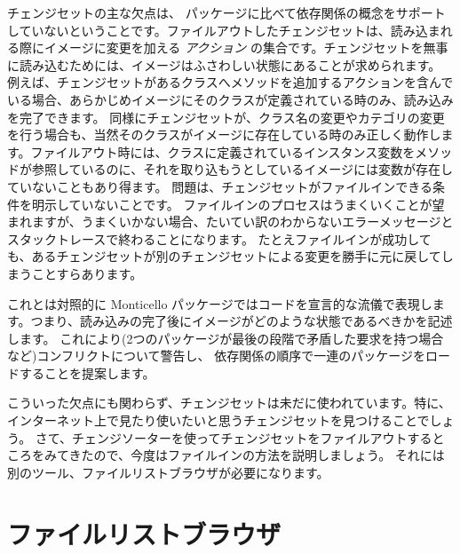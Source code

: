 \documentclass[a4paper,10pt,twoside]{book}
\begin{document}
チェンジセットの主な欠点は、 パッケージに比べて依存関係の概念をサポートしていないということです。ファイルアウトしたチェンジセットは、読み込まれる際にイメージに変更を加える \emph{アクション} の集合です。チェンジセットを無事に読み込むためには、イメージはふさわしい状態にあることが求められます。
例えば、チェンジセットがあるクラスへメソッドを追加するアクションを含んでいる場合、あらかじめイメージにそのクラスが定義されている時のみ、読み込みを完了できます。
同様にチェンジセットが、クラス名の変更やカテゴリの変更を行う場合も、当然そのクラスがイメージに存在している時のみ正しく動作します。ファイルアウト時には、クラスに定義されているインスタンス変数をメソッドが参照しているのに、それを取り込もうとしているイメージには変数が存在していないこともあり得ます。
問題は、チェンジセットがファイルインできる条件を明示していないことです。
ファイルインのプロセスはうまくいくことが望まれますが、うまくいかない場合、たいてい訳のわからないエラーメッセージとスタックトレースで終わることになります。
たとえファイルインが成功しても、あるチェンジセットが別のチェンジセットによる変更を勝手に元に戻してしまうことすらあります。

これとは対照的に Monticello パッケージではコードを宣言的な流儀で表現します。つまり、読み込みの完了後にイメージがどのような状態であるべきかを記述します。
これにより(2つのパッケージが最後の段階で矛盾した要求を持つ場合など)コンフリクトについて警告し、
依存関係の順序で一連のパッケージをロードすることを提案します。

こういった欠点にも関わらず、チェンジセットは未だに使われています。特に、インターネット上で見たり使いたいと思うチェンジセットを見つけることでしょう。
さて、チェンジソーターを使ってチェンジセットをファイルアウトするところをみてきたので、今度はファイルインの方法を説明しましょう。
それには別のツール、ファイルリストブラウザが必要になります。


\section{ファイルリストブラウザ}
\end{document}
